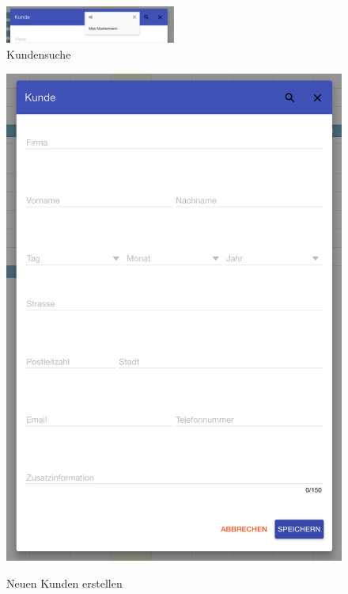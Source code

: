 \begin{figure}[H]
\centering\includegraphics[width=0.5\textwidth]{images/frontend_customer_search.png}
\caption{Kundensuche}
\label{customer_search}
\end{figure}

\begin{figure}[H]
    \centering
    \begin{minipage}[t]{0.49\linewidth}
        \centering
        \includegraphics[width=\linewidth]{images/frontend_customer_new.png}
        \label{frontend_customer_new}
        \caption{Neuen Kunden erstellen}
    \end{minipage}%

\end{figure}
